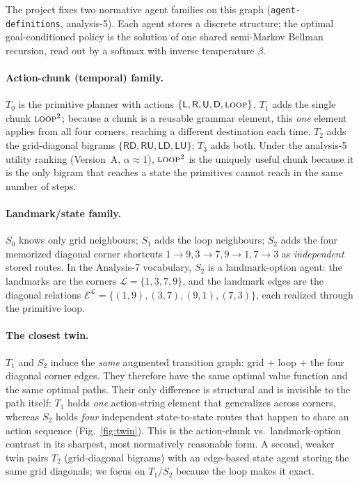 \documentclass[10pt]{article}
\begin{document}
The project fixes two normative agent families on this graph (\texttt{agent-definitions},
analysis-5). Each agent stores a discrete structure; the optimal goal-conditioned policy is
the solution of one shared semi-Markov Bellman recursion, read out by a softmax with
inverse temperature $\beta$.

\paragraph{Action-chunk (temporal) family.}
$T_0$ is the primitive planner with actions $\{\textsf{L},\textsf{R},\textsf{U},\textsf{D},
\textsc{loop}\}$. $T_1$ adds the single chunk $\textsc{loop}^2$; because a chunk is a
reusable grammar element, this \emph{one} element applies from all four corners, reaching
a different destination each time. $T_2$ adds the grid-diagonal bigrams
$\{\textsf{RD},\textsf{RU},\textsf{LD},\textsf{LU}\}$; $T_3$ adds both. Under the
analysis-5 utility ranking (Version~A, $\alpha\!\approx\!1$), $\textsc{loop}^2$ is the
uniquely useful chunk because it is the only bigram that reaches a state the primitives
cannot reach in the same number of steps.

\paragraph{Landmark/state family.}
$S_0$ knows only grid neighbours; $S_1$ adds the loop neighbours; $S_2$ adds the four
memorized diagonal corner shortcuts $1\!\to\!9,3\!\to\!7,9\!\to\!1,7\!\to\!3$ as
\emph{independent} stored routes. In the Analysis-7 vocabulary, $S_2$ is a landmark-option
agent: the landmarks are the corners $\mathcal L=\{1,3,7,9\}$, and the landmark edges are
the diagonal relations $\mathcal E^{\mathcal L}=\{(1,9),(3,7),(9,1),(7,3)\}$, each realized
through the primitive loop.

\paragraph{The closest twin.}
$T_1$ and $S_2$ induce the \emph{same} augmented transition graph: grid $+$ loop $+$ the
four diagonal corner edges. They therefore have the same optimal value function and the
same optimal paths. Their only difference is structural and is invisible to the path
itself: $T_1$ holds \emph{one} action-string element that generalizes across corners,
whereas $S_2$ holds \emph{four} independent state-to-state routes that happen to share an
action sequence (Fig.~\ref{fig:twin}). This is the action-chunk vs.\ landmark-option
contrast in its sharpest, most normatively reasonable form. A second, weaker twin pairs
$T_2$ (grid-diagonal bigrams) with an edge-based state agent storing the same grid
diagonals; we focus on $T_1$/$S_2$ because the loop makes it exact.
\end{document}
